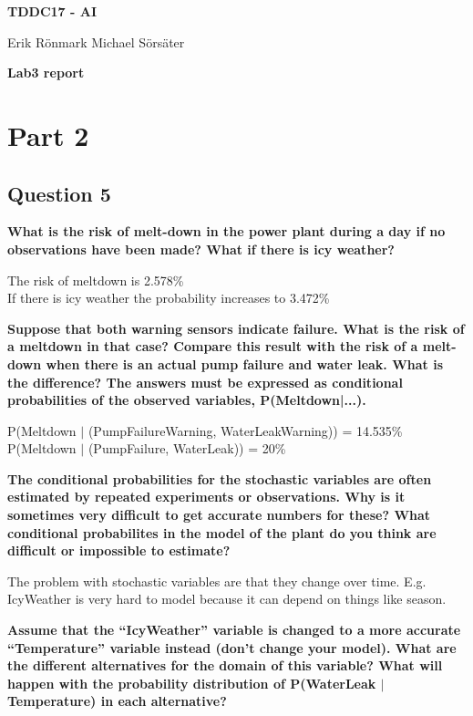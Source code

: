 \documentclass[12pt,a4paper]{article}
\begin{document}
\begin{center}
    \Huge
    \textbf{TDDC17 - AI}

    \vspace{0.3cm}
    \Large
    Erik Rönmark
    Michael Sörsäter

    \vspace{0.7cm}
    \textbf{Lab3 report}
\end{center}

\section{Part 2}
\subsection{Question 5}
\textbf{What is the risk of melt-down in the power plant during a day if no observations have been made? What if there is icy weather?}

The risk of meltdown is 2.578\% \\
If there is icy weather the probability increases to 3.472\%

\textbf{Suppose that both warning sensors indicate failure. What is the risk of a meltdown in that case? Compare this result with the risk of a melt-down when there is an actual pump failure and water leak. What is the difference? The answers must be expressed as conditional probabilities of the observed variables, P(Meltdown|...).}

P(Meltdown $|$ (PumpFailureWarning, WaterLeakWarning)) = 14.535\% \\
P(Meltdown $|$ (PumpFailure, WaterLeak)) = 20\%

\textbf{The conditional probabilities for the stochastic variables are often estimated by repeated experiments or observations. Why is it sometimes very difficult to get accurate numbers for these? What conditional probabilites in the model of the plant do you think are difficult or impossible to estimate?}

The problem with stochastic variables are that they change over time. E.g. IcyWeather is very hard to model because it can depend on things like season.

\textbf{Assume that the ``IcyWeather'' variable is changed to a more accurate ``Temperature'' variable instead (don't change your model). What are the different alternatives for the domain of this variable? What will happen with the probability distribution of P(WaterLeak $|$ Temperature) in each alternative?}
\end{document}
